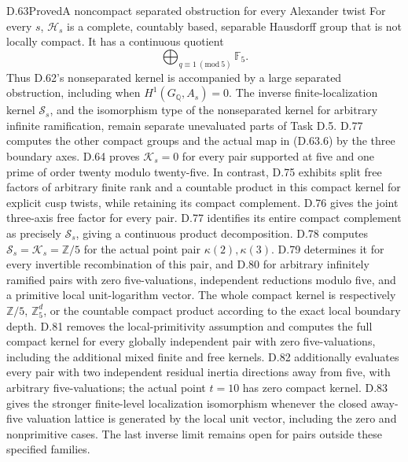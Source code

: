 \begin{statement}{D.63}{Proved}{A noncompact separated obstruction for every Alexander twist}
For every \(s\), \(\mathcal H_s\) is a complete,
countably based, separable Hausdorff group that is not
locally compact. It has a continuous quotient
\[
           \bigoplus_{q\equiv1\ (\mathrm{mod}\ 5)}\mathbb F_5.
                                                        \tag{D.63.7}
\]
Thus D.62's nonseparated kernel is accompanied by a large
separated obstruction, including when \(H^1(G_{\mathbb Q},A_s)=0\).
The inverse finite-localization kernel \(\mathcal S_s\), and
the isomorphism type of the nonseparated kernel for arbitrary
infinite ramification, remain separate unevaluated parts of
Task D.5. D.77 computes the other compact groups and the
actual map in (D.63.6) by the three boundary axes. D.64 proves
\(\mathcal K_s=0\) for every pair supported at five and
one prime of order twenty modulo twenty-five.
In contrast, D.75 exhibits split free factors of arbitrary
finite rank and a countable product in this compact kernel
for explicit cusp twists, while retaining its compact complement.
D.76 gives the joint three-axis free factor for every pair.
D.77 identifies its entire compact complement as precisely
\(\mathcal S_s\), giving a continuous product decomposition.
D.78 computes \(\mathcal S_s=\mathcal K_s=\mathbb Z/5\)
for the actual point pair \(\kappa(2),\kappa(3)\).
D.79 determines it for every invertible recombination of this
pair, and D.80 for arbitrary infinitely ramified pairs with
zero five-valuations, independent reductions modulo five,
and a primitive local unit-logarithm vector. The whole compact
kernel is respectively \(\mathbb Z/5\), \(\mathbb Z_5^d\),
or the countable compact product according to the exact local
boundary depth. D.81 removes the local-primitivity assumption and computes
the full compact kernel for every globally independent pair
with zero five-valuations, including the additional mixed
finite and free kernels. D.82 additionally evaluates every pair with two independent
residual inertia directions away from five, with arbitrary
five-valuations; the actual point \(t=10\) has zero compact
kernel. D.83 gives the stronger finite-level localization
isomorphism whenever the closed away-five valuation lattice
is generated by the local unit vector, including the zero
and nonprimitive cases. The last inverse limit remains open
for pairs outside these specified families.
\end{statement}

